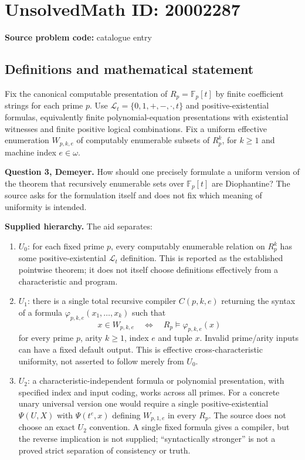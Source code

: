 \documentclass[11pt]{article}
\newcommand{\F}{\mathbb{F}}
\begin{document}
\section*{UnsolvedMath ID: 20002287}
\textbf{Source problem code:} catalogue entry
\subsection{Definitions and mathematical statement}
Fix the canonical computable presentation of $R_p=\F_p[t]$ by finite coefficient strings for each prime $p$. Use $\mathcal L_t=\{0,1,+,-,\cdot,t\}$ and positive-existential formulas, equivalently finite polynomial-equation presentations with existential witnesses and finite positive logical combinations. Fix a uniform effective enumeration $W_{p,k,e}$ of computably enumerable subsets of $R_p^k$, for $k\ge1$ and machine index $e\in\omega$.

\textbf{Question 3, Demeyer.} How should one precisely formulate a uniform version of the theorem that recursively enumerable sets over $\F_p[t]$ are Diophantine? The source asks for the formulation itself and does not fix which meaning of uniformity is intended.

\textbf{Supplied hierarchy.} The aid separates:
\begin{enumerate}
\item $U_0$: for each fixed prime $p$, every computably enumerable relation on $R_p^k$ has some positive-existential $\mathcal L_t$ definition. This is reported as the established pointwise theorem; it does not itself choose definitions effectively from a characteristic and program.
\item $U_1$: there is a single total recursive compiler $C(p,k,e)$ returning the syntax of a formula $\varphi_{p,k,e}(x_1,\ldots,x_k)$ such that
\[
 x\in W_{p,k,e}\quad\Longleftrightarrow\quad
 R_p\models\varphi_{p,k,e}(x)
\]
for every prime $p$, arity $k\ge1$, index $e$ and tuple $x$. Invalid prime/arity inputs can have a fixed default output. This is effective cross-characteristic uniformity, not asserted to follow merely from $U_0$.
\item $U_2$: a characteristic-independent formula or polynomial presentation, with specified index and input coding, works across all primes. For a concrete unary universal version one would require a single positive-existential $\Psi(U,X)$ with $\Psi(t^e,x)$ defining $W_{p,1,e}$ in every $R_p$. The source does not choose an exact $U_2$ convention. A single fixed formula gives a compiler, but the reverse implication is not supplied; ``syntactically stronger'' is not a proved strict separation of consistency or truth.
\end{enumerate}
\end{document}
